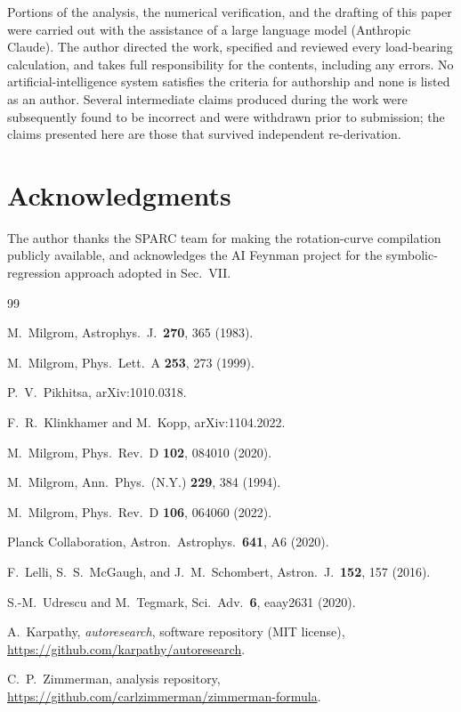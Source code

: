 \documentclass[11pt]{article}
\begin{document}
Portions of the analysis, the numerical verification, and the drafting of this paper were carried out
with the assistance of a large language model (Anthropic Claude). The author directed the work,
specified and reviewed every load-bearing calculation, and takes full responsibility for the contents,
including any errors. No artificial-intelligence system satisfies the criteria for authorship and none
is listed as an author. Several intermediate claims produced during the work were subsequently found to
be incorrect and were withdrawn prior to submission; the claims presented here are those that survived
independent re-derivation.

\section*{Acknowledgments}
The author thanks the SPARC team for making the rotation-curve compilation publicly available, and
acknowledges the AI Feynman project for the symbolic-regression approach adopted in Sec.~VII.


\begin{thebibliography}{99}

 M.~Milgrom, Astrophys.\ J.\ \textbf{270}, 365 (1983).

 M.~Milgrom, Phys.\ Lett.\ A \textbf{253}, 273 (1999).

 P.~V.~Pikhitsa, arXiv:1010.0318.

 F.~R.~Klinkhamer and M.~Kopp, arXiv:1104.2022.

 M.~Milgrom, Phys.\ Rev.\ D \textbf{102}, 084010 (2020).

 M.~Milgrom, Ann.\ Phys.\ (N.Y.) \textbf{229}, 384 (1994).

 M.~Milgrom, Phys.\ Rev.\ D \textbf{106}, 064060 (2022).

 Planck Collaboration, Astron.\ Astrophys.\ \textbf{641}, A6 (2020).

 F.~Lelli, S.~S.~McGaugh, and J.~M.~Schombert, Astron.\ J.\ \textbf{152}, 157 (2016).

 S.-M.~Udrescu and M.~Tegmark, Sci.\ Adv.\ \textbf{6}, eaay2631 (2020).

 A.~Karpathy, \emph{autoresearch}, software repository (MIT license),
  \url{https://github.com/karpathy/autoresearch}.

 C.~P.~Zimmerman, analysis repository,
  \url{https://github.com/carlzimmerman/zimmerman-formula}.

\end{thebibliography}
\end{document}
